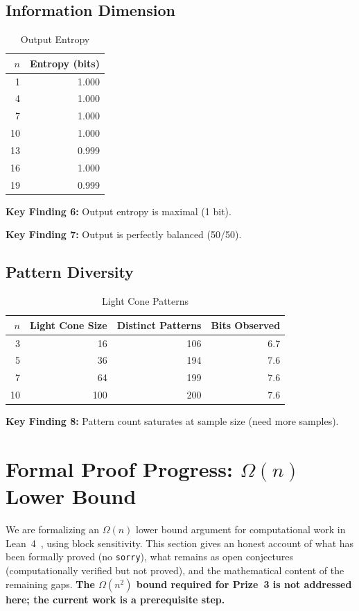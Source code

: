 \documentclass[11pt]{article}
\begin{document}
\subsection{Information Dimension}

\begin{table}[t]
\centering
\caption{Output Entropy}
\label{tab:entropy}
\begin{tabular}{@{}rr@{}}
\toprule
$n$ & Entropy (bits) \\
\midrule
1  & 1.000 \\
4  & 1.000 \\
7  & 1.000 \\
10 & 1.000 \\
13 & 0.999 \\
16 & 1.000 \\
19 & 0.999 \\
\bottomrule
\end{tabular}
\end{table}

\textbf{Key Finding 6:} Output entropy is maximal (1 bit).

\textbf{Key Finding 7:} Output is perfectly balanced (50/50).

\subsection{Pattern Diversity}

\begin{table}[t]
\centering
\caption{Light Cone Patterns}
\label{tab:patterns}
\begin{tabular}{@{}rrrr@{}}
\toprule
$n$ & Light Cone Size & Distinct Patterns & Bits Observed \\
\midrule
3  & 16   & 106 & 6.7 \\
5  & 36   & 194 & 7.6 \\
7  & 64   & 199 & 7.6 \\
10 & 100  & 200 & 7.6 \\
\bottomrule
\end{tabular}
\end{table}

\textbf{Key Finding 8:} Pattern count saturates at sample size (need more samples).

\section{Formal Proof Progress: $\Omega(n)$ Lower Bound}

We are formalizing an $\Omega(n)$ lower bound argument for computational work in Lean~4~\citep{moura_2021}, using block sensitivity. This section gives an honest account of what has been formally proved (no \texttt{sorry}), what remains as open conjectures (computationally verified but not proved), and the mathematical content of the remaining gaps. \textbf{The $\Omega(n^2)$ bound required for Prize~3 is not addressed here; the current work is a prerequisite step.}
\end{document}
